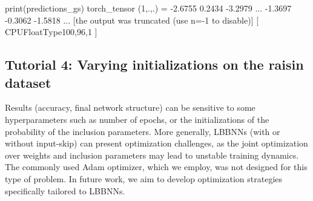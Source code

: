 \begin{example}
print(predictions_gs)
torch_tensor
(1,.,.) = 
-2.6755
0.2434
-3.2979
...
-1.3697
-0.3062
-1.5818
... [the output was truncated (use n=-1 to disable)]
[ CPUFloatType{100,96,1} ]
\end{example}


\subsection{Tutorial 4: Varying initializations on the raisin dataset}
Results (accuracy, final network structure) can be sensitive to some hyperparameters such as number of epochs, or the initializations of the probability of the inclusion parameters. 
More generally, LBBNNs (with or without input-skip) can present optimization challenges, as the joint optimization over weights and inclusion parameters may lead to unstable training dynamics. The commonly used Adam optimizer, which we employ, was not designed for this type of problem. In future work, we aim to develop optimization strategies specifically tailored to LBBNNs.

